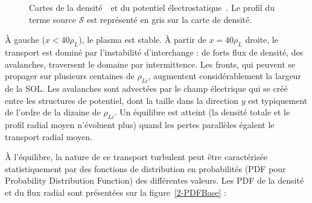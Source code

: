 \begin{refsection}
\begin{figure}[!htbp]
    \centering
    \caption{Cartes de la densité~~et du potentiel
    électrostatique~. Le profil du terme source
    $\mathcal{S}$ est représenté en gris sur la carte de densité.
    }
    \label{2-CartesBase}
\end{figure}

À gauche ($x<40 \rho_L$), le plasma est stable. À partir de $x=40 \rho_L$
droite, le transport est dominé par l'instabilité d'interchange : de forts flux de densité, des avalanches, traversent le domaine par intermittence.
Les fronts, qui peuvent se propager sur plusieurs centaines de
$\rho_{Li}$, augmentent considérablement la largeur de la SOL.
Les avalanches sont advectées par le champ électrique qui se créé entre les
structures de potentiel, dont la taille dans la direction $y$ est
typiquement de l'ordre de la dizaine de $\rho_{Li}$.
Un équilibre est atteint (la densité totale et le profil radial moyen
n'évoluent plus) quand les pertes parallèles égalent le transport radial moyen.

À l'équilibre, la nature de ce transport turbulent peut être
caractérisée statistiquement par des fonctions de distribution en probabilités
(PDF pour Probability Distribution Function) des différentes valeurs. Les PDF
de la densité et du flux radial sont présentées sur la figure~\ref{2-PDFBase} : 


\end{refsection}

